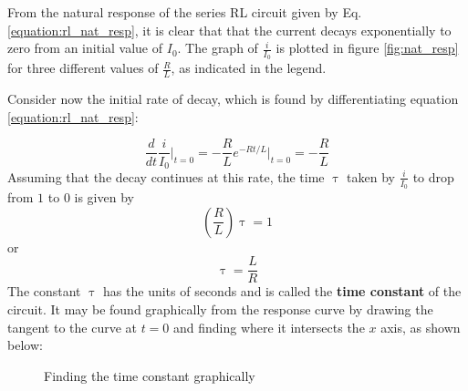 \documentclass[11pt]{article}
\numberwithin{equation}{section}
\begin{document}
\begin{flushleft}
From the natural response of the series RL circuit given by Eq.\ref{equation:rl_nat_resp}, it is clear that
that the current decays exponentially to zero from an initial value of $I_0$. The graph of $\frac{i}{I_0}$
is plotted in figure \ref{fig:nat_resp} for three different values of $\frac{R}{L}$, as indicated in the legend.

Consider now the initial rate of decay, which is found by differentiating equation \ref{equation:rl_nat_resp}:

\begin{equation*}
\frac{d}{dt}\frac{i}{I_0}\Biggr|_{t=0} = -\frac{R}{L}e^{-Rt/L}\Biggr|_{t=0} = -\frac{R}{L}
\end{equation*}
Assuming that the decay continues at this rate, the time $\uptau$ taken by $\frac{i}{I_0}$ to drop from
$1$ to $0$ is given by
\begin{equation*}
\left(\frac{R}{L}\right)\uptau = 1
\end{equation*}
or
\begin{equation}
\boxed{\uptau = \frac{L}{R}}
\end{equation}
The constant $\uptau$ has the units of seconds and is called the \textbf{time constant} of the circuit.
It may be found graphically from the response curve by drawing the tangent to the curve at $t=0$ and
finding where it intersects the $x$ axis, as shown below:

\begin{tcolorbox}[colframe=black]
\begin{figure}[H]
\centering
{}
\caption{Finding the time constant graphically}
\label{fig:finding_tau_graphically}
\end{figure}
\end{tcolorbox}


\end{flushleft}
\end{document}
